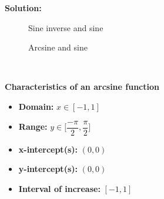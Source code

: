 \documentclass[12pt]{book}
\begin{document}
\begin{enumerate}
\textbf{Solution:}\\
\begin{minipage}{.5\textwidth}
    \begin{figure}[H]
    \caption{Sine inverse and sine}
    \end{figure} 
\end{minipage}
\begin{minipage}{.5\textwidth}
    \begin{figure}[H]
    \caption{Arcsine and sine}
    \end{figure} 
\end{minipage}\\
\begin{center}
\textbf{Characteristics of an arcsine function}\\
\end{center}
\begin{itemize}
    \item \textbf{Domain:} $x \in [-1, 1]$
    
    \item \textbf{Range:} $y \in \bigg[\dfrac{-\pi}{2},\dfrac{\pi}{2}\bigg]$
    
    \item \textbf{x-intercept(s):} $(0,0)$
    
    \item \textbf{y-intercept(s):} $(0,0)$
    
    \item \textbf{Interval of increase:} $[-1,1]$
    

\end{itemize}
\end{enumerate}
\end{document}

